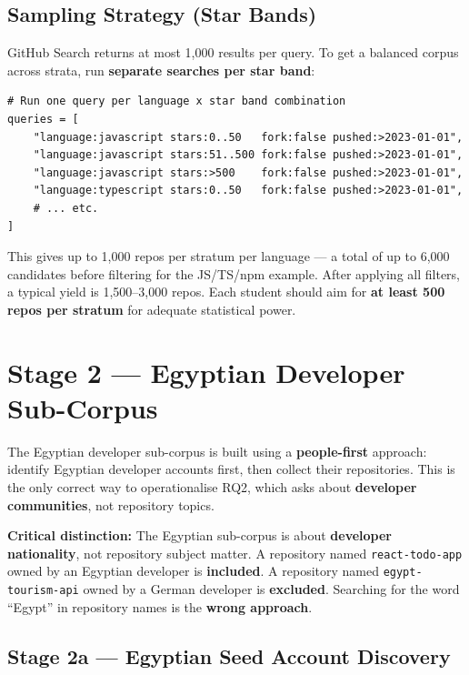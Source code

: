 \documentclass[11pt,a4paper]{article}
\begin{document}
\subsection{Sampling Strategy (Star Bands)}

GitHub Search returns at most 1,000 results per query. To get a balanced corpus across strata, run \textbf{separate searches per star band}:

\begin{lstlisting}
# Run one query per language x star band combination
queries = [
    "language:javascript stars:0..50   fork:false pushed:>2023-01-01",
    "language:javascript stars:51..500 fork:false pushed:>2023-01-01",
    "language:javascript stars:>500    fork:false pushed:>2023-01-01",
    "language:typescript stars:0..50   fork:false pushed:>2023-01-01",
    # ... etc.
]
\end{lstlisting}

This gives up to 1,000 repos per stratum per language — a total of up to 6,000 candidates before filtering for the JS/TS/npm example. After applying all filters, a typical yield is 1,500–3,000 repos. Each student should aim for \textbf{at least 500 repos per stratum} for adequate statistical power.

\section{Stage 2 — Egyptian Developer Sub-Corpus}

The Egyptian developer sub-corpus is built using a \textbf{people-first} approach: identify Egyptian developer accounts first, then collect their repositories. This is the only correct way to operationalise RQ2, which asks about \textbf{developer communities}, not repository topics.

\begin{warnbox}
\textbf{Critical distinction:} The Egyptian sub-corpus is about \textbf{developer nationality}, not repository subject matter. A repository named \texttt{react-todo-app} owned by an Egyptian developer is \textbf{included}. A repository named \texttt{egypt-tourism-api} owned by a German developer is \textbf{excluded}. Searching for the word ``Egypt'' in repository names is the \textbf{wrong approach}.
\end{warnbox}

\subsection{Stage 2a — Egyptian Seed Account Discovery}
\end{document}

